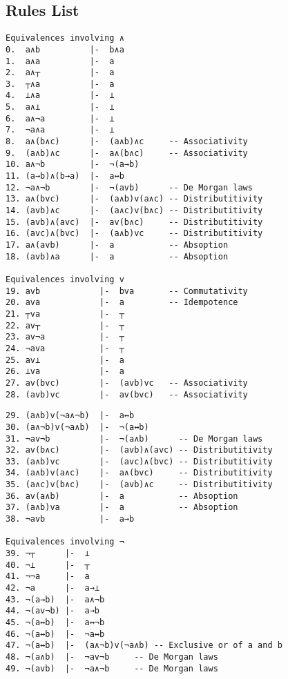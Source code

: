 \documentclass[draft]{report}
\begin{document}
\begin{appendices}
\chapter{Rules List}
\label{chap:rules_list}

\begin{listing}[ht]
\begin{verbatim}
Equivalences involving ∧
0.  a∧b          |-  b∧a
1.  a∧a          |-  a
2.  a∧┬          |-  a
3.  ┬∧a          |-  a
4.  ⊥∧a          |-  ⊥
5.  a∧⊥          |-  ⊥
6.  a∧¬a         |-  ⊥
7.  ¬a∧a         |-  ⊥       
8.  a∧(b∧c)      |-  (a∧b)∧c     -- Associativity
9.  (a∧b)∧c      |-  a∧(b∧c)     -- Associativity
10. a∧¬b         |-  ¬(a→b)
11. (a→b)∧(b→a)  |-  a↔b
12. ¬a∧¬b        |-  ¬(avb)      -- De Morgan laws
13. a∧(bvc)      |-  (a∧b)v(a∧c) -- Distributitivity
14. (avb)∧c      |-  (a∧c)v(b∧c) -- Distributitivity
15. (avb)∧(avc)  |-  av(b∧c)     -- Distributitivity
16. (avc)∧(bvc)  |-  (a∧b)vc     -- Distributitivity
17. a∧(avb)      |-  a           -- Absoption
18. (avb)∧a      |-  a           -- Absoption

Equivalences involving v
19. avb            |-  bva       -- Commutativity
20. ava            |-  a         -- Idempotence
21. ┬va            |-  ┬
22. av┬            |-  ┬
23. av¬a           |-  ┬
24. ¬ava           |-  ┬
25. av⊥            |-  a
26. ⊥va            |-  a
27. av(bvc)        |-  (avb)vc   -- Associativity
28. (avb)vc        |-  av(bvc)   -- Associativity
\end{verbatim}
\end{listing}

\begin{listing}[ht]
\begin{verbatim}
29. (a∧b)v(¬a∧¬b)  |-  a↔b
30. (a∧¬b)v(¬a∧b)  |-  ¬(a↔b)
31. ¬av¬b          |-  ¬(a∧b)      -- De Morgan laws
32. av(b∧c)        |-  (avb)∧(avc) -- Distributitivity
33. (a∧b)vc        |-  (avc)∧(bvc) -- Distributitivity
34. (a∧b)v(a∧c)    |-  a∧(bvc)     -- Distributitivity
35. (a∧c)v(b∧c)    |-  (avb)∧c     -- Distributitivity
36. av(a∧b)        |-  a           -- Absoption
37. (a∧b)va        |-  a           -- Absoption
38. ¬avb           |-  a→b

Equivalences involving ¬
39. ¬┬      |-  ⊥
40. ¬⊥      |-  ┬
41. ¬¬a     |-  a
42. ¬a      |-  a→⊥
43. ¬(a→b)  |-  a∧¬b
44. ¬(av¬b) |-  a→b
45. ¬(a↔b)  |-  a↔¬b
46. ¬(a↔b)  |-  ¬a↔b
47. ¬(a↔b)  |-  (a∧¬b)v(¬a∧b) -- Exclusive or of a and b
48. ¬(a∧b)  |-  ¬av¬b     -- De Morgan laws
49. ¬(avb)  |-  ¬a∧¬b     -- De Morgan laws


\end{verbatim}
\end{listing}
\end{appendices}
\end{document}
